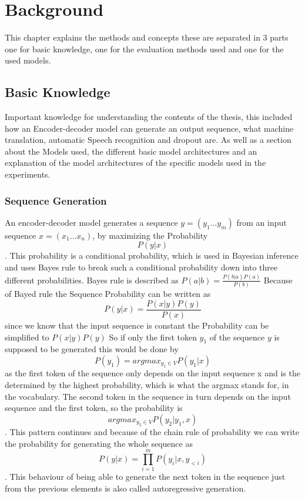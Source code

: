 \chapter{Background}
\label{ch:background}
This chapter explains the methods and concepts these are separated in 3 parts one for basic knowledge, one for the evaluation methods used and one for the used models. 

\section{Basic Knowledge}
Important knowledge for understanding the contents of the thesis, this included how an Encoder-decoder model can generate an output sequence, what machine translation, automatic Speech recognition and dropout are. As well as a section about the Models used, the different basic model architectures and an explanation of the model architectures of the specific models used in the experiments.

\subsection{Sequence Generation}
An encoder-decoder model generates a sequence $y=(y_1\dots y_m)$ from an input sequence $x=(x_1\dots x_n)$, by maximizing the Probability $$P(y|x)$$.
This probability is a conditional probability, which is used in Bayesian inference and uses Bayes rule to break such a conditional probability down into three different probabilities. Bayes rule is described as $P(a|b)=\frac{P(b|a)P(a)}{P(b)}$ 
Because of Bayed rule the Sequence Probability can be written as $$P(y|x)= \frac{P(x|y)P(y)}{P(x)}$$ since we know that the input sequence is constant the Probability can be simplified to $P(x|y)P(y)$
So if only the first token $y_1$ of the sequence $y$ is supposed to be generated this would be done by $$P(y_1)=argmax _{y_1\in V} P(y_1|x)$$ as the first token of the sequence only depends on the input sequence x and is the determined by the highest probability, which is what the argmax stands for, in the vocabulary. 
The second token in the sequence in turn depends on the input sequence and the first token, so the probability is 
$$argmax_{y_2\in V}P(y_2|y_1,x)$$. This pattern continues and because of the chain rule of probability we can write the probability for generating the whole sequence as $$P(y|x)= \prod_{i=1}^m P(y_i|x, y_{<i})$$. \cite[chapters~3, 9.5, 10, 13]{jm3}
This behaviour of being able to generate the next token in the sequence just from the previous elements is also called autoregressive generation. 

